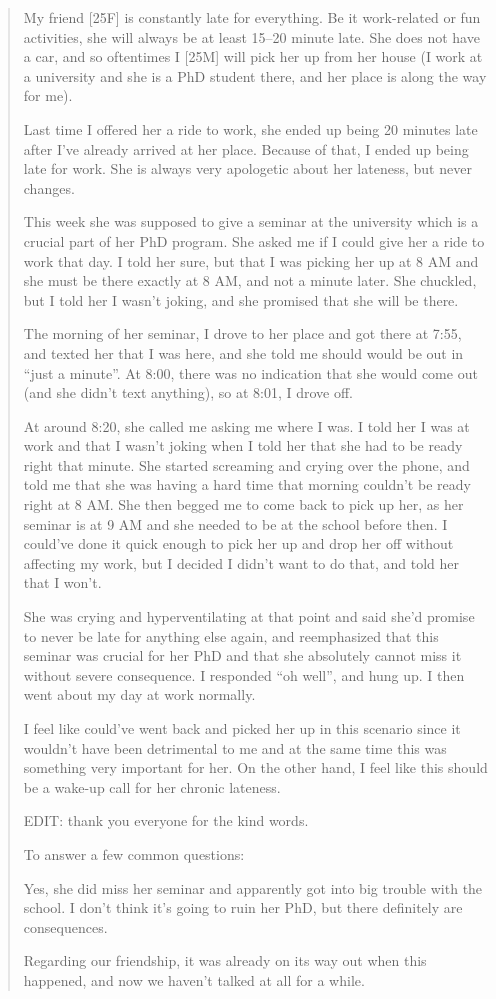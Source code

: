 \begin{quote}
My friend [25F] is constantly late for everything. Be it work-related
or fun activities, she will always be at least 15--20 minute late. She
does not have a car, and so oftentimes I [25M] will pick her up from her
house (I work at a university and she is a PhD student there, and her
place is along the way for me).

Last time I offered her a ride to work, she ended up being 20 minutes
late after I've already arrived at her place. Because of that, I ended
up being late for work. She is always very apologetic about her
lateness, but never changes.

This week she was supposed to give a seminar at the university which is
a crucial part of her PhD program. She asked me if I could give her a
ride to work that day. I told her sure, but that I was picking her up at
8 AM and she must be there exactly at 8 AM, and not a minute later. She
chuckled, but I told her I wasn't joking, and she promised that she
will be there.

The morning of her seminar, I drove to her place and got there at 7:55,
and texted her that I was here, and she told me should would be out in
``just a minute''. At 8:00, there was no indication that she would come
out (and she didn't text anything), so at 8:01, I drove off.

At around 8:20, she called me asking me where I was. I told her I was at
work and that I wasn't joking when I told her that she had to be ready
right that minute. She started screaming and crying over the phone, and
told me that she was having a hard time that morning couldn't be ready
right at 8 AM. She then begged me to come back to pick up her, as her
seminar is at 9 AM and she needed to be at the school before then. I
could've done it quick enough to pick her up and drop her off without
affecting my work, but I decided I didn't want to do that, and told her
that I won't.

She was crying and hyperventilating at that point and said she'd
promise to never be late for anything else again, and reemphasized that
this seminar was crucial for her PhD and that she absolutely cannot
miss it without severe consequence. I responded ``oh well'', and hung
up. I then went about my day at work normally.

I feel like could've went back and picked her up in this scenario since
it wouldn't have been detrimental to me and at the same time this was
something very important for her. On the other hand, I feel like this
should be a wake-up call for her chronic lateness.

EDIT: thank you everyone for the kind words.

To answer a few common questions:

Yes, she did miss her seminar and apparently got into big trouble with
the school. I don't think it's going to ruin her PhD, but there
definitely are consequences.

Regarding our friendship, it was already on its way out when this
happened, and now we haven't talked at all for a while.
\end{quote}


